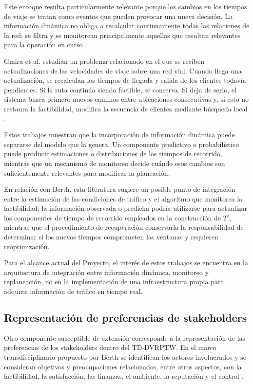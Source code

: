 \documentclass[11pt]{article}
\begin{document}
Este enfoque resulta particularmente relevante porque los cambios en los tiempos de viaje se
tratan como eventos que pueden provocar una nueva decisión. La información dinámica no obliga
a recalcular continuamente todas las relaciones de la red; se filtra y se monitorean principalmente
aquellas que resultan relevantes para la operación en curso
\parencite{fleischmann_gnutzmann_sandvoss_2004}.

Gmira et al. estudian un problema relacionado en el que se reciben actualizaciones de las
velocidades de viaje sobre una red vial. Cuando llega una actualización, se recalculan los tiempos
de llegada y salida de los clientes todavía pendientes. Si la ruta continúa siendo factible, se
conserva. Si deja de serlo, el sistema busca primero nuevos caminos entre ubicaciones consecutivas
y, si esto no restaura la factibilidad, modifica la secuencia de clientes mediante búsqueda local
\parencite{gmira_et_al_2021}.

Estos trabajos muestran que la incorporación de información dinámica puede separarse del modelo
que la genera. Un componente predictivo o probabilístico puede producir estimaciones o
distribuciones de los tiempos de recorrido, mientras que un mecanismo de monitoreo decide cuándo
esos cambios son suficientemente relevantes para modificar la planeación.

En relación con Berth, esta literatura sugiere un posible punto de integración entre la estimación
de las condiciones de tráfico y el algoritmo que monitorea la factibilidad: la información observada
o predicha podría utilizarse para actualizar los componentes de tiempo de recorrido empleados en
la construcción de \(T'\), mientras que el procedimiento de recuperación conservaría la
responsabilidad de determinar si los nuevos tiempos comprometen las ventanas y requieren
reoptimización.

Para el alcance actual del Proyecto, el interés de estos trabajos se encuentra en la arquitectura de
integración entre información dinámica, monitoreo y replaneación, no en la implementación de una
infraestructura propia para adquirir información de tráfico en tiempo real.

\subsection{Representación de preferencias de stakeholders}

Otro componente susceptible de extensión corresponde a la representación de las
preferencias de los stakeholders dentro del TD-DVRPTW. En el marco transdisciplinario
propuesto por Berth se identifican los actores involucrados y se consideran objetivos
y preocupaciones relacionados, entre otros aspectos, con la factibilidad, la satisfacción,
las finanzas, el ambiente, la reputación y el control
\parencite{berth_thesis_2025}.
\end{document}
